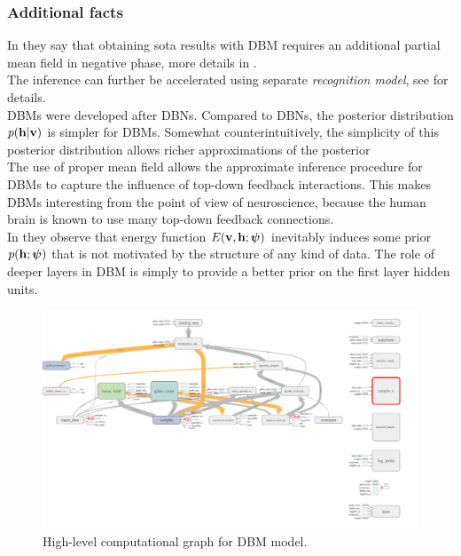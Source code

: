 \subsubsection{Additional facts}
\textbullet{} In \cite{goodfellow2016deep} they say that obtaining sota results with DBM requires an additional partial mean field in negative phase, more details in \cite{goodfellow2013multi}.
\\
\textbullet{} The inference can further be accelerated using separate \emph{recognition model}, see \cite{salakhutdinov2010efficient} for details.
\\
\textbullet{} DBMs were developed after DBNs. Compared to DBNs, the posterior distribution $p(\mathbf{h}|\mathbf{v})$ is simpler for DBMs. Somewhat counterintuitively, the simplicity of this posterior distribution allows richer approximations of the posterior \cite{goodfellow2016deep}
\\
\textbullet{} The use of proper mean field allows the approximate inference procedure for DBMs to capture the influence of top-down feedback interactions. This makes
DBMs interesting from the point of view of neuroscience, because the human brain
is known to use many top-down feedback connections\cite{goodfellow2016deep}.
\\
\textbullet{} In \cite{goodfellow2013joint} they observe that energy function $E(\mathbf{v},\mathbf{h};\boldsymbol{\psi})$ inevitably induces some prior $p(\mathbf{h};\boldsymbol{\psi})$ that is not motivated by the structure of any kind of data. The role of deeper layers in DBM is simply to provide a better prior on the first layer hidden units.

\clearpage
\begin{figure}[h]
\begin{mdframed}
\centering
\includegraphics[width=6.4in]{dbm/tf_graph.png}
\caption{High-level computational graph for DBM model.}
\end{mdframed}
\end{figure}
